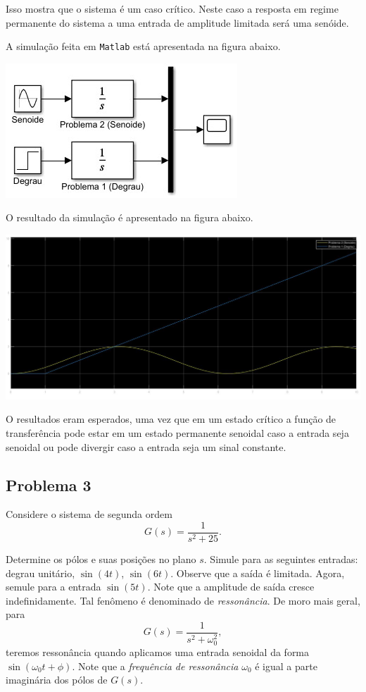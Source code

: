 \documentclass[
]{book}
\begin{document}
Isso mostra que o sistema é um caso crítico. Neste caso a resposta em regime permanente do sistema a uma entrada de amplitude limitada será uma senóide.

A simulação feita em \texttt{Matlab} está apresentada na figura abaixo.

\includegraphics{Imagens/Lab2/simP2.jpg}

O resultado da simulação é apresentado na figura abaixo.

\includegraphics{Imagens/Lab2/prob2B.jpg}

O resultados eram esperados, uma vez que em um estado crítico a função de transferência pode estar em um estado permanente senoidal caso a entrada seja senoidal ou pode divergir caso a entrada seja um sinal constante.

\hypertarget{problema-3}{%
\subsection*{Problema 3}\label{problema-3}}

Considere o sistema de segunda ordem
\[
G(s) = \frac {1}{s^2 +25}.
\]

Determine os pólos e suas posições no plano \(s\). Simule para as seguintes entradas: degrau unitário, \(\sin (4t)\), \(\sin(6t)\). Observe que a saída é limitada. Agora, semule para a entrada \(\sin(5t)\). Note que a amplitude de saída cresce indefinidamente. Tal fenômeno é denominado de \emph{ressonância}. De moro mais geral, para
\[
G(s) = \frac {1}{s^2+\omega_0^2},
\]
teremos ressonância quando aplicamos uma entrada senoidal da forma \(\sin(\omega_0t + \phi)\). Note que a \emph{frequência de ressonância} \(\omega_0\) é igual a parte imaginária dos pólos de \(G(s)\).
\end{document}
